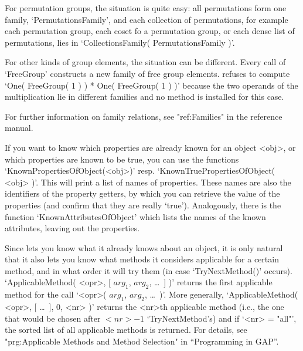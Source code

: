 For permutation groups, the situation is quite easy:
all permutations form  one family, `PermutationsFamily',
and each collection of permutations,
for example each permutation group, each coset fo a permutation group,
or each dense list of permutations,
lies in `CollectionsFamily( PermutationsFamily )'.

For other kinds of group elements, the situation can be different.
Every call of `FreeGroup' constructs a new family of free group elements.
{\GAP} refuses to compute `One( FreeGroup( 1 ) ) * One( FreeGroup( 1 ) )'
because the two operands of the multiplication lie in different families
and no method is installed for this case.

For further information on family relations,
see "ref:Families" in the reference manual.

%
%
If you want to know  which properties are already known for an object
<obj>, or which properties are known to be true, you can use the
functions `KnownPropertiesOfObject(<obj>)' resp.
`KnownTruePropertiesOfObject( <obj> )'. This will print a list of names
of properties. These names are also the identifiers of the property
getters, by which you can retrieve the value of the properties (and
confirm that they are really `true'). Analogously, there is the function
`KnownAttributesOfObject' which lists the names of the known attributes,
leaving out the properties.

%
Since {\GAP} lets you know what it already  knows about an object, it is
only natural  that   it also  lets   you know what  methods  it considers
applicable for a certain method, and in  what order it  will try them (in
case `TryNextMethod()'  occurs).   `ApplicableMethod( <opr>, [   $arg_1$,
$arg_2$, \dots\ ]  )' returns the  first  applicable method for the  call
`<opr>( $arg_1$, $arg_2$,  \dots\ )'. More  generally, `ApplicableMethod(
<opr>, [ \dots\ ], 0, <nr> )' returns the <nr>th applicable method (i.e.,
the one  that would be  chosen  after  $<nr>-1$ `TryNextMethod's) and  if
`<nr>  = "all"', the sorted list  of  all applicable methods is returned.
For  details,  see "prg:Applicable Methods  and  Method Selection" in
``Programming in GAP''.

